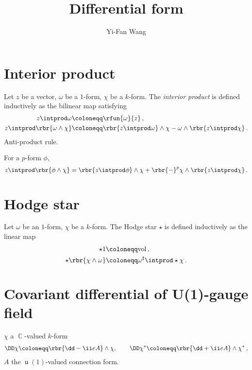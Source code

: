 \documentclass[a4paper]{article}
\title{Differential form}
\author{Yi-Fan Wang}
\begin{document}
\maketitle


\tableofcontents

\section{Interior product}

Let $z$ be a vector, $\omega$ be a $1$-form, $\chi$ be a $k$-form. 
The \emph{interior product} is defined inductively as the bilinear map
satisfying
\begin{align}
z \intprod \omega &\coloneqq \rfun{\omega}{z}\,, \\
z \intprod \rbr{\omega \wedge \chi} &\coloneqq
	\rbr{z\intprod\omega}\wedge \chi - \omega \wedge \rbr{z\intprod \chi}\,.
\end{align}
Anti-product rule.

For a $p$-form $\phi$,
\begin{align}
z \intprod \rbr{\phi \wedge \chi} =
	\rbr{z\intprod\phi}\wedge \chi +
		\rbr{-}^{p} \chi \wedge \rbr{z\intprod \chi}\,.
\end{align}

\section{Hodge star}

Let $\omega$ be an $1$-form, $\chi$ be a $k$-form. The Hodge star
$\star$ is defined inductively as the linear map \cite[sec.\ 24]{Burke1985}
\begin{align}
\star 1 &\coloneqq \mathrm{vol}\,, \\
\star\rbr{\chi\wedge\omega} &\coloneqq \omega^{\sharp} \intprod \star\chi\,.
\label{eq:hodge-100}
\end{align}

\section{Covariant differential of U(1)-gauge field}
$\chi$ a $\BbbC$-valued $k$-form
\begin{align}
\DD\chi \coloneqq \rbr{\dd - \ii e A}\wedge \chi,
\qquad
\DD\chi^* \coloneqq \rbr{\dd + \ii e A}\wedge \chi^*\,,
\end{align}
$A$ the $\mfraku(1)$-valued connection form.
\end{document}

